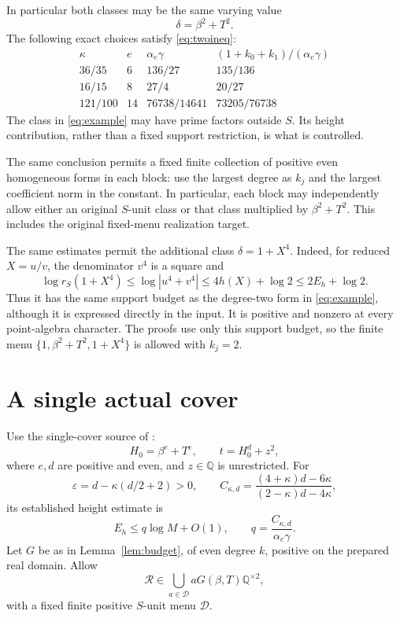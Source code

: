 \documentclass[11pt,a4paper]{article}
\newcommand{\Q}{\mathbb Q}\newcommand{\Z}{\mathbb Z}
\begin{document}
In particular both classes may be the same varying value
\begin{equation}\label{eq:example}
                       \delta=\beta^2+T^2.
\end{equation}
The following exact choices satisfy \eqref{eq:twoineq}:
\[
\begin{array}{c|c|c|c}
\kappa&e&\alpha_e\gamma&(1+k_0+k_1)/(\alpha_e\gamma)\\\hline
36/35&6&136/27&135/136\\
16/15&8&27/4&20/27\\
121/100&14&76738/14641&73205/76738
\end{array}
\]
The class in \eqref{eq:example} may have prime factors outside $S$.
Its height contribution, rather than a fixed support restriction,
is what is controlled.

The same conclusion permits a fixed finite collection of positive
even homogeneous forms in each block: use the largest degree as
$k_j$ and the largest coefficient norm in the constant. In particular,
each block may independently allow either an original $S$-unit class
or that class multiplied by $\beta^2+T^2$. This includes the original
fixed-menu realization target.

The same estimates permit the additional class $\delta=1+X^4$.
Indeed, for reduced $X=u/v$, the denominator $v^4$ is a square and
\[
 \log r_S(1+X^4)\le\log|u^4+v^4|
 \le4h(X)+\log2\le2E_h+\log2.
\]
Thus it has the same support budget as the degree-two form in
\eqref{eq:example}, although it is expressed directly in the input.
It is positive and nonzero at every point-algebra character.
The proofs use only this support budget, so the finite menu
$\{1,\beta^2+T^2,1+X^4\}$ is allowed with $k_j=2$.

\section{A single actual cover}

Use the single-cover source of \cite{Single}:
\[
 H_0=\beta^e+T^e,\qquad t=H_0^d+z^2,
\]
where $e,d$ are positive and even, and $z\in\Q$ is unrestricted.
For
\[
 \varepsilon=d-\kappa(d/2+2)>0,
 \qquad C_{\kappa,d}
   =\frac{(4+\kappa)d-6\kappa}{(2-\kappa)d-4\kappa},
\]
its established height estimate is
\[
 E_h\le q\log M+O(1),\qquad
 q=\frac{C_{\kappa,d}}{\alpha_e\gamma}.
\]
Let $G$ be as in Lemma~\ref{lem:budget}, of even degree $k$, positive
on the prepared real domain. Allow
\[
 \mathcal R\in\bigcup_{a\in\mathcal D}aG(\beta,T)\Q^{\times2},
\]
with a fixed finite positive $S$-unit menu $\mathcal D$.
\end{document}
